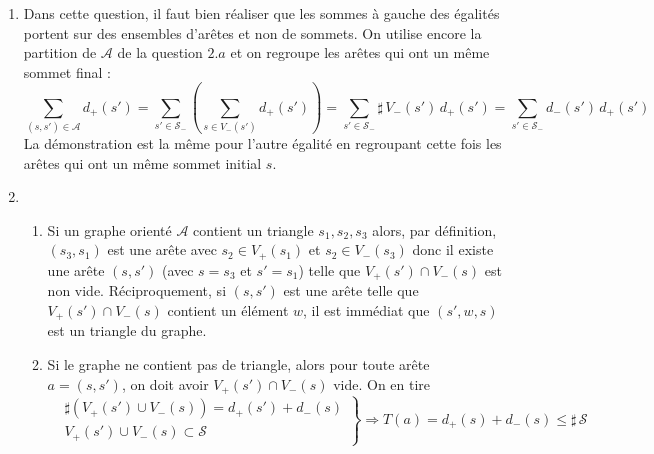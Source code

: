 \begin{enumerate}
 \item Dans cette question, il faut bien réaliser que les sommes à gauche des égalités portent sur des ensembles d'arêtes et non de sommets. On utilise encore la partition de $\mathcal{A}$ de la question $2.a$ et on regroupe les arêtes qui ont un même sommet final :
\begin{displaymath}
 \sum_{(s,s')\in\mathcal A}d_+(s') = \sum_{s'\in \mathcal S_-}\left(\sum_{s\in V_-(s')}d_+(s') \right) 
= \sum_{s'\in \mathcal S_-} \sharp\,V_-(s')\, d_+(s')
= \sum_{s'\in \mathcal S_-} d_-(s')\, d_+(s')
\end{displaymath}
 La démonstration est la même pour l'autre égalité en regroupant cette fois les arêtes qui ont un même sommet initial $s$.

 \item 
\begin{enumerate}
 \item 
Si un graphe orienté $\mathcal A$ contient un triangle $s_1,s_2,s_3$ alors, par définition, $(s_3,s_1)$ est une arête avec $s_2\in V_+(s_1)$ et $s_2\in V_-(s_3)$ donc il existe une arête $(s,s')$ (avec $s=s_3$ et $s'=s_1$) telle que $V_+(s')\cap V_-(s)$ est non vide.\newline
Réciproquement, si $(s,s')$ est une arête telle que $V_+(s')\cap V_-(s)$ contient un élément $w$, il est immédiat que $(s',w,s)$ est un triangle du graphe.
 
 \item Si le graphe ne contient pas de triangle, alors pour toute arête $a=(s,s')$, on doit avoir $V_+(s')\cap V_-(s)$ vide. On en tire
\begin{displaymath}
\left. 
\begin{aligned}
 & \sharp\left( V_+(s')\cup V_-(s)\right) = d_+(s') + d_-(s) \\
 & V_+(s')\cup V_-(s) \subset \mathcal S
\end{aligned}
\right\rbrace \Rightarrow
T(a) = d_+(s) + d_-(s) \leq \sharp\, \mathcal S
\end{displaymath}
\end{enumerate}


\end{enumerate}
